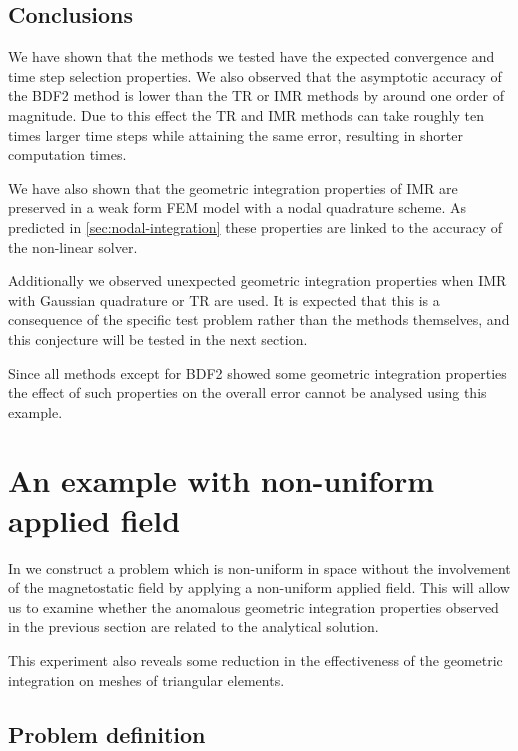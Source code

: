 \subsection{Conclusions}

We have shown that the methods we tested have the expected convergence and time step selection properties.
We also observed that the asymptotic accuracy of the BDF2 method is lower than the TR or IMR methods by around one order of magnitude.
Due to this effect the TR and IMR methods can take roughly ten times larger time steps while attaining the same error, resulting in shorter computation times.

We have also shown that the geometric integration properties of IMR are preserved in a weak form FEM model with a nodal quadrature scheme.
As predicted in \cref{sec:nodal-integration} these properties are linked to the accuracy of the non-linear solver.

Additionally we observed unexpected geometric integration properties when IMR with Gaussian quadrature or TR are used.
It is expected that this is a consequence of the specific test problem rather than the methods themselves, and this conjecture will be tested in the next section.

Since all methods except for BDF2 showed some geometric integration properties the effect of such properties on the overall error cannot be analysed using this example.


\FloatBarrier
\section{An example with non-uniform applied field}
\label{sec:non-uniform-applied}

In  we construct a problem which is non-uniform in space without the involvement of the magnetostatic field by applying a non-uniform applied field.
This will allow us to examine whether the anomalous geometric integration properties observed in the previous section are related to the analytical solution.

This experiment also reveals some reduction in the effectiveness of the geometric integration on meshes of triangular elements.

\subsection{Problem definition}

